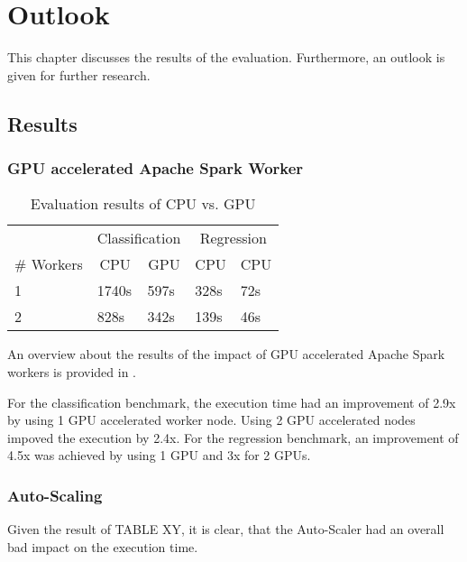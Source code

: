 \chapter{Outlook}
\label{chap:08_outlook}

This chapter discusses the results of the evaluation. Furthermore, an outlook is given for further research.


\section{Results}


\subsection{GPU accelerated Apache Spark Worker}
\begin{table}[]
\centering
\begin{tabular}{@{}l|ll|ll@{}}
\toprule
  & \multicolumn{2}{c|}{Classification} & \multicolumn{2}{c}{Regression} \\
\multicolumn{1}{c|}{\# Workers} & \multicolumn{1}{c}{CPU} & \multicolumn{1}{c|}{GPU} & \multicolumn{1}{c}{CPU} & \multicolumn{1}{c}{CPU} \\ \midrule
1 & 1740s       & 597s        & 328s      & 72s     \\
2 & 828s       & 342s        & 139s      & 46s     \\ \bottomrule
\end{tabular}
\caption{Evaluation results of CPU vs. GPU}
\label{table:08_results_cpu-gpu}
\end{table}
An overview about the results of the impact of GPU accelerated  Apache Spark workers is provided in .


For the classification benchmark, the execution time had an improvement of 2.9x by using 1 GPU accelerated worker node. Using 2 GPU accelerated nodes impoved the execution by 2.4x.
For the regression benchmark, an improvement of 4.5x was achieved by using 1 GPU and 3x for 2 GPUs.


\subsection{Auto-Scaling}
Given the result of TABLE XY, it is clear, that the Auto-Scaler had an overall bad impact on the execution time.

